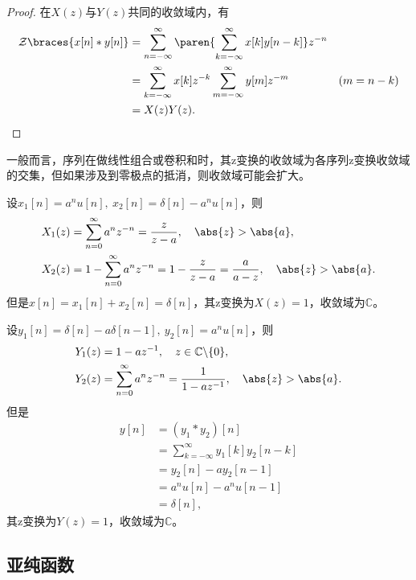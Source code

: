 \begin{proof}
    在$X(z)$与$Y(z)$共同的收敛域内，有
    \begin{align}
        \mathcal{Z}\braces{x[n]*y[n]} & =\sum_{n=-\infty}^{\infty}\paren{\sum_{k=-\infty}^{\infty}x[k]y[n-k]}z^{-n}\nonumber                    \\
                                      & =\sum_{k=-\infty}^{\infty}x[k]z^{-k}\sum_{m=-\infty}^{\infty}y[m]z^{-m}              & (m=n-k)\nonumber \\
                                      & =X(z)Y(z).
    \end{align}
\end{proof}

一般而言，序列在做线性组合或卷积和时，其z变换的收敛域为各序列z变换收敛域的交集，但如果涉及到零极点的抵消，则收敛域可能会扩大。
\begin{example}[收敛域的扩张]
    设$x_1[n]=a^{n}u[n],\ x_2[n]=\delta[n]-a^{n}u[n]$，则
    \begin{align}
        X_1(z) & =\sum_{n=0}^{\infty}a^{n}z^{-n}=\frac{z}{z-a},\quad \abs{z}>\abs{a},                   \\
        X_2(z) & =1-\sum_{n=0}^{\infty}a^{n}z^{-n}=1-\frac{z}{z-a}=\frac{a}{a-z},\quad \abs{z}>\abs{a}.
    \end{align}
    但是$x[n]=x_1[n]+x_2[n]=\delta[n]$，其z变换为$X(z)=1$，收敛域为$\mathbb{C}$。

    设$y_1[n]=\delta[n]-a\delta[n-1],\ y_2[n]=a^{n}u[n]$，则
    \begin{align}
        Y_1(z) & =1-az^{-1},\quad z\in\mathbb{C}\backslash\{0\},                            \\
        Y_2(z) & =\sum_{n=0}^{\infty}a^{n}z^{-n}=\frac{1}{1-az^{-1}},\quad \abs{z}>\abs{a}.
    \end{align}
    但是
    \begin{align}
        y[n] & =(y_1*y_2)[n]\nonumber                            \\
             & =\sum_{k=-\infty}^{\infty}y_1[k]y_2[n-k]\nonumber \\
             & =y_2[n]-a y_2[n-1]\nonumber                       \\
             & =a^{n}u[n]-a^{n}u[n-1]\nonumber                 \\
             & =\delta[n],
    \end{align}
    其z变换为$Y(z)=1$，收敛域为$\mathbb{C}$。
\end{example}

\subsection{亚纯函数}\label{sub:meromorphic_function}

